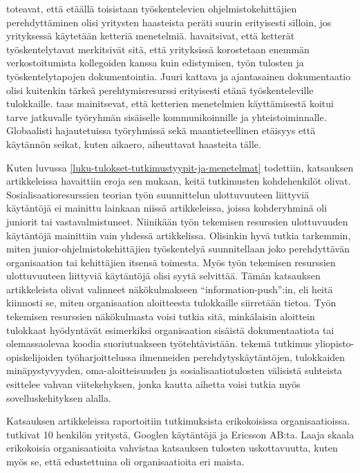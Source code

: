 \documentclass[utf8]{gradu3}
\begin{document}
\textcite{britto-ym-2017} toteavat, että etäällä toisistaan työskentelevien ohjelmistokehittäjien perehdyttäminen olisi yritysten haasteista peräti suurin erityisesti silloin, jos yrityksessä käytetään ketteriä menetelmiä. \textcite{britto-ym-2017} havaitsivat, että ketterät työskentelytavat merkitsivät sitä, että yrityksissä korostetaan enemmän verkostoitumista kollegoiden kanssa kuin edistymisen, työn tulosten ja työskentelytapojen dokumentointia. Juuri kattava ja ajantasainen dokumentaatio olisi kuitenkin tärkeä perehtymisresurssi erityisesti etänä työskenteleville tulokkaille. \textcite{moe-ym-2020} taas mainitsevat, että ketterien menetelmien käyttämisestä koitui tarve jatkuvalle työryhmän sisäiselle kommunikoinnille ja yhteistoiminnalle. Globaalisti hajautetuissa työryhmissä sekä maantieteellinen etäisyys että käytännön seikat, kuten aikaero, aiheuttavat haasteita tälle.

Kuten luvussa \ref{luku-tulokset-tutkimustyypit-ja-menetelmat} todettiin, katsauksen artikkeleissa havaittiin eroja sen mukaan, keitä tutkimusten kohdehenkilöt olivat. Sosialisaatioresurssien teorian työn suunnittelun ulottuvuuteen liittyviä käytäntöjä ei mainittu lainkaan niissä artikkeleissa, joissa kohderyhminä oli juniorit tai vastavalmistuneet. Niinikään työn tekemisen resurssien ulottuvuuden käytäntöjä mainittiin vain yhdessä artikkelissa. Olisinkin hyvä tutkia tarkemmin, miten junior-ohjelmistokehittäjien työskentelyä suunnitellaan joko perehdyttävän organisaation tai kehittäjien itsensä toimesta. Myös työn tekemisen resurssien ulottuvuuteen liittyviä käytäntöjä olisi syytä selvittää. Tämän katsauksen artikkeleista \textcite{yates-ym-2020} olivat valinneet näkökulmakseen ``information-push'':in, eli heitä kiinnosti se, miten organisaation aloitteesta tulokkaille siirretään tietoa. Työn tekemisen resurssien näkökulmasta voisi tutkia sitä, minkälaisin aloittein tulokkaat hyödyntävät esimerkiksi organisaation sisäistä dokumentaatiota tai olemassaolevaa koodia suoriutuakseen työtehtävistään. \textcite{gruman-ym-2006} tekemä tutkimus yliopisto-opiskelijoiden työharjoittelussa ilmenneiden perehdytyskäytäntöjen, tulokkaiden minäpystyvyyden, oma-aloitteisuuden ja sosialisaatiotulosten välisistä suhteista esittelee vahvan viitekehyksen, jonka kautta aihetta voisi tutkia myös sovelluskehityksen alalla.

Katsauksen artikkeleissa raportoitiin tutkimuksista erikokoisissa organisaatioissa. \textcite{viana-ym-2014} tutkivat 10 henkilön yritystä, \textcite{johnson-senges-2010} Googlen käytäntöjä ja \textcite{britto-ym-2020} Ericsson AB:ta. Laaja skaala erikokoisia organisaatioita vahvistaa katsauksen tulosten uskottavuutta, kuten myös se, että edustettuina oli organisaatioita eri maista.
\end{document}

